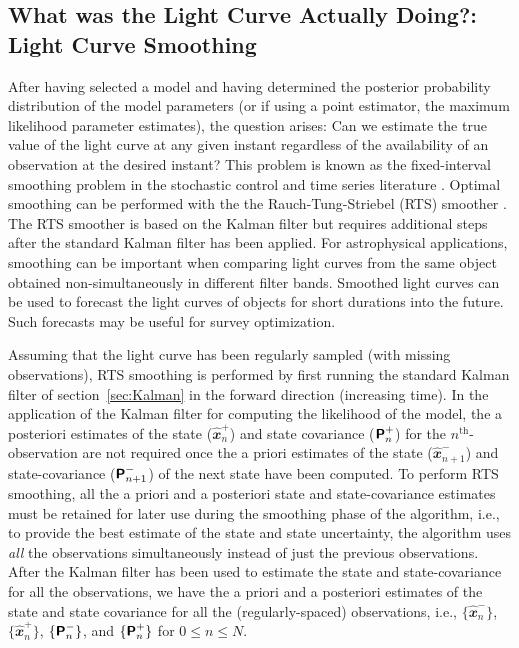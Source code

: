 \documentclass[a4paper,fleqn,usenatbib]{mnras}
\begin{document}
\subsection[Light Curve Smoothing]{What was the Light Curve Actually Doing?: Light Curve Smoothing}\label{sec:Smoothing}

After having selected a model and having determined the posterior probability distribution of the model parameters (or if using a point estimator, the maximum likelihood parameter estimates), the question arises: Can we estimate the true value of the light curve at any given instant regardless of the availability of an observation at the desired instant? This problem is known as the fixed-interval smoothing problem in the stochastic control and time series literature \citep{Simon,DurbinKoopman}. Optimal smoothing can be performed with the the Rauch-Tung-Striebel (RTS) smoother \citep*{RTS65}. The RTS smoother is based on the Kalman filter but requires additional steps after the standard Kalman filter has been applied. For astrophysical applications, smoothing can be important when comparing light curves from the same object obtained non-simultaneously in different filter bands. Smoothed light curves can be used to forecast the light curves of objects for short durations into the future. Such forecasts may be useful for survey optimization.

Assuming that the light curve has been regularly sampled (with missing observations), RTS smoothing is performed by first running the standard Kalman filter of section~\ref{sec:Kalman} in the forward direction (increasing time). In the application of the Kalman filter for computing the likelihood of the model, the a posteriori estimates of the state ($\widehat{\mathbfit{x}}^{+}_{n}$) and state covariance ($\textbf{\textsf{P}}^{+}_{n}$) for the $n^{\mathrm{th}}$-observation are not required once the a priori estimates of the state ($\widehat{\mathbfit{x}}^{-}_{n+1}$) and state-covariance ($\textbf{\textsf{P}}^{-}_{n+1}$) of the next state have been computed. To perform RTS smoothing, all the a priori and a posteriori state and state-covariance estimates must be retained for later use during the smoothing phase of the algorithm, i.e., to provide the best estimate of the state and state uncertainty, the algorithm uses \textit{all} the observations simultaneously instead of just the previous observations.
After the Kalman filter has been used to estimate the state and state-covariance for all the observations, we have the a priori and a posteriori estimates of the state and state covariance for all the (regularly-spaced) observations, i.e., $\{ \widehat{\mathbfit{x}}^{-}_{n} \}$, $\{ \widehat{\mathbfit{x}}^{+}_{n} \}$, $\{ \textbf{\textsf{P}}^{-}_{n} \}$, and $\{ \textbf{\textsf{P}}^{+}_{n} \}$ for $0 \leq n \leq N$.
\end{document}
